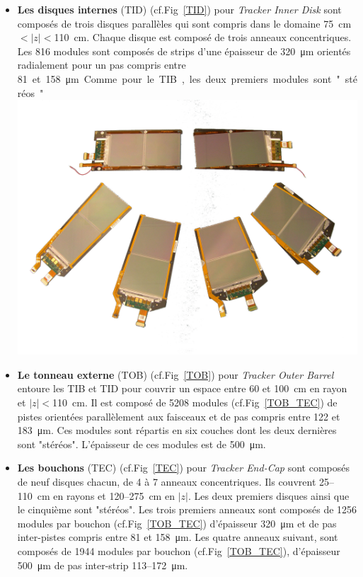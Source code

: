 \begin{itemize}[label=$\bullet$]
\item \textbf{Les disques internes} (TID) (cf.Fig~\ref{TID}) pour \textit{Tracker Inner Disk} sont composés de trois disques parallèles qui sont compris dans le domaine \SI{75}{\centi\meter}$<|z|<$\SI{110}{\centi\meter}. Chaque disque est composé de trois anneaux concentriques. Les \num{816} modules sont composés de strips d'une épaisseur de \SI{320}{\micro\meter} orientés radialement pour un pas compris entre \SI{81} et \SI{158}{\micro\meter}. Comme pour le TIB, les deux premiers modules sont "stéréos".
\marginpar
{
	\centering
	\includegraphics[width=\marginparwidth]{CMS/TOB_TEC.png}
	\label{TOB_TEC}
}
\item \textbf{Le tonneau externe } (TOB) (cf.Fig~\ref{TOB}) pour \textit{Tracker Outer Barrel} entoure les TIB et TID pour couvrir un espace entre \num{60} et \SI{100}{\centi\meter} en rayon et $|z|<$\SI{110}{\centi\meter}. Il est composé de \num{5208} modules (cf.Fig~\ref{TOB_TEC}) de pistes orientées parallèlement aux faisceaux et de pas compris entre \num{122} et \SI{183}{\micro\meter}. Ces modules sont répartis en six couches dont les deux dernières sont "stéréos". L'épaisseur de ces modules est de \SI{500}{\micro\meter}.   

\item \textbf{Les bouchons }(TEC) (cf.Fig~\ref{TEC}) pour \textit{Tracker End-Cap} sont composés de neuf disques chacun, de \num{4} à \num{7} anneaux concentriques. Ils couvrent \num{25}--\SI{110}{\centi\meter} en rayons et \num{120}--\SI{275}{\centi\meter} en $|z|$. Les deux premiers disques ainsi que le cinquième sont "stéréos". Les trois premiers anneaux sont composés de \num{1256} modules par bouchon (cf.Fig~\ref{TOB_TEC}) d'épaisseur \SI{320}{\micro\meter} et de pas inter-pistes compris entre \num{81} et \SI{158}{\micro\meter}. Les quatre anneaux suivant, sont composés de \num{1944} modules par bouchon (cf.Fig~\ref{TOB_TEC}), d'épaisseur \SI{500}{\micro\meter} de pas inter-strip \num{113}--\SI{172}{\micro\meter}.
\end{itemize}

